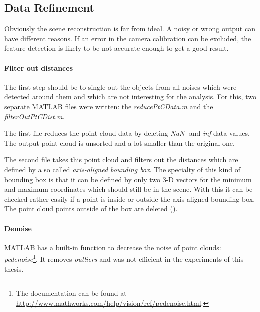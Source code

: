 \subsection{Data Refinement}\label{ssec:DataRefinement}
Obviously the scene reconstruction is far from ideal. A noisy or wrong output can have different reasons. If an error in the camera calibration can be excluded, the feature detection is likely to be not accurate enough to get a good result. 


\paragraph{Filter out distances}
The first step should be to single out the objects from all noises which were detected around them and which are not interesting for the analysis. For this, two separate MATLAB files were written: the \textit{reducePtCData.m} and the \textit{filterOutPtCDist.m}.

The first file reduces the point cloud data by deleting \textit{NaN}- and \textit{inf}-data values. The output point cloud is unsorted and a lot smaller than the original one.

The second file takes this point cloud and filters out the distances which are defined by a so called \textit{axis-aligned bounding box}. The specialty of this kind of bounding box is that it can be defined by only two 3-D vectors for the minimum and maximum coordinates which should still be in the scene. With this it can be checked rather easily if a point is inside or outside the axis-aligned bounding box. The point cloud points outside of the box are deleted (\cite[p.216 et seq.]{Gregory.2014}).

\paragraph{Denoise}
MATLAB has a built-in function to decrease the noise of point clouds: \textit{pcdenoise}\footnote{The documentation can be found at \url{http://www.mathworks.com/help/vision/ref/pcdenoise.html}.}. It removes \textit{outliers} and was not efficient in the experiments of this thesis. 

